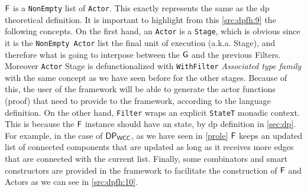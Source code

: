 $\mathsf{F}$ is a \texttt{NonEmpty} list of \texttt{Actor}. This exactly represents the same as the \acrshort{dp} theoretical definition.
It is important to highlight from this \autoref{src:dpfh:9} the following concepts. 
On the first hand, an \texttt{Actor} is a \texttt{Stage}, which is obvious since it is the \texttt{NonEmpty Actor} list the final unit of execution (a.k.a. Stage), and therefore what is going to interpose between the $\mathsf{G}$ and the previous Filters. 
Moreover \texttt{Actor} Stage is defunctionalized with \texttt{WithFilter} \emph{Associated type family} with the same concept as we have seen before for the other stages. 
Because of this, the user of the framework will be able to generate the actor functions (proof) that need to provide to the framework, according to the language definition.
On the other hand, \texttt{Filter} wraps an explicit \texttt{StateT} monadic context. This is because the $\mathsf{F}$ instance should have an state, by \acrshort{dp} definition in \autoref{sec:dp}.
For example, in the case of $\mathsf{DP_{WCC}}$, as we have seen in \autoref{prole} $\mathsf{F}$ keeps an updated list of connected components that are updated as long as it receives more edges that are connected with the current list.
Finally, some combinators and smart constructors are provided in the framework to facilitate the construction of $\mathsf{F}$ and Actors as we can see in \autoref{src:dpfh:10}.

